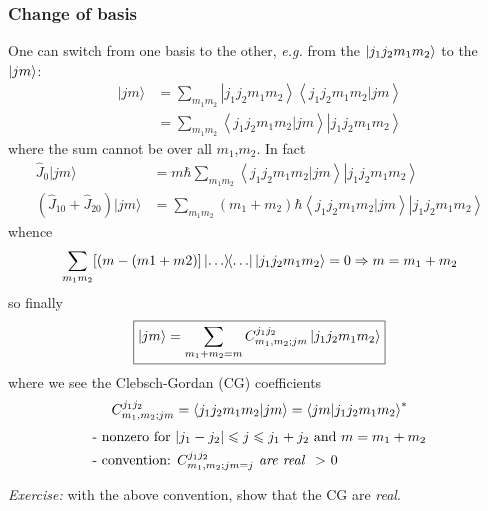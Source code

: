 \documentclass[12pt]{article}
\newcommand{\be}{\begin{equation}}
\newcommand{\ee}{\end{equation}}
\begin{document}

\subsubsection{Change of basis}

One can switch from one basis to the other, \textit{e.g.}
from the $\ket{j_1 j_2 m_1 m_2}$ to the $\ket{jm}$:
\[
\begin{aligned}
|j m\rangle
&=\sum_{m_{1} m_{2}}\left|j_{1} j_{2} m_{1} m_{2}\right\rangle\left\langle j_{1} j_{2} m_{1} m_{2} |j m\right\rangle\\
&=\sum_{m_{1} m_{2}}\left\langle j_{1} j_{2} m_{1} m_{2} | j m\right\rangle\left|j_{1} j_{2} m_{1} m_{2}\right\rangle
\end{aligned}
\]
where the sum cannot be over all $m_1$,$m_2$.
In fact
\[
\begin{aligned}
\hat{J}_{0}|j m\rangle
&=m \hbar \sum_{m_{1} m_{2}}\left\langle j_{1} j_{2} m_{1} m_{2} | j m\right\rangle\left|j_{1} j_{2} m_{1} m_{2}\right\rangle\\
\left(\hat{J}_{10}+\hat{J}_{20}\right)|j m\rangle
&=\sum_{m_{1} m_{2}}\left(m_{1}+m_{2}\right) \hbar\left\langle j_{1} j_{2} m_{1} m_{2} | j m\right\rangle\left|j_{1} j_{2} m_{1} m_{2}\right\rangle
\end{aligned}
\]
whence
\be
\sum_{m_1 m_2}
[(m-(m1+m2)]\op{\ldots}\ket{j_1j_2m_1m_2} = 0
\Rightarrow m = m_1+m_2
\ee
so finally
\be
\boxed{
\ket{jm} = \sum_{m_1+m_2=m}
C^{j_1j_2}_{m_1,m_2;jm} %
\ket{j_1j_2m_1m_2}
}
\ee
where we see the Clebsch-Gordan (CG) coefficients
\be
C^{j_1j_2}_{m_1,m_2;jm} = 
\bra{j_1j_2m_1m_2}\ket{jm} =
\bra{jm}\ket{j_1j_2m_1m_2}^*
\ee
%
\begin{align}
&\text{- nonzero for } |j_1-j_2| \leqslant j \leqslant j_1+j_2 \text{ and } m = m_1+m_2\\
&\text{- convention: } C^{j_1j_2}_{m_1,m_2;jm=j} \text{\emph{ are real } > 0}
\end{align}

\emph{Exercise:} with the above convention, show that the CG are \emph{real}.
\end{document}
